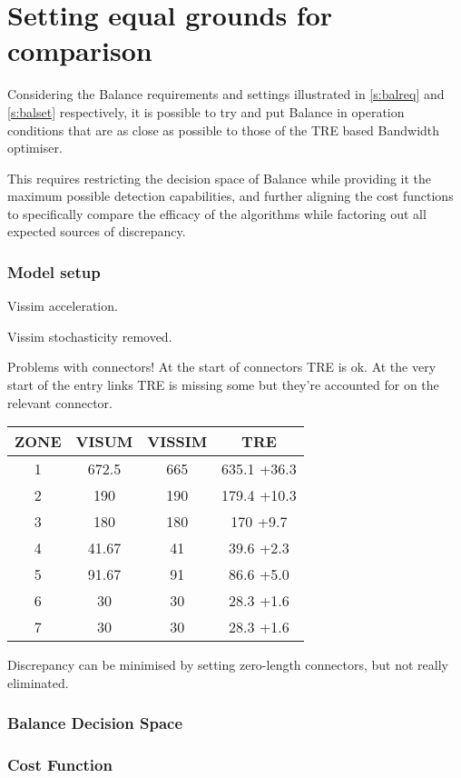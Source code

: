 \section{Setting equal grounds for comparison}

Considering the Balance requirements and settings illustrated in \ref{s:balreq} and \ref{s:balset} respectively, it is possible to try and put Balance in operation conditions that are as close as possible to those of the TRE based Bandwidth optimiser.

This requires restricting the decision space of Balance while providing it the maximum possible detection capabilities, and further aligning the cost functions to specifically compare the efficacy of the algorithms while factoring out all expected sources of discrepancy.

\subsubsection{Model setup}

Vissim acceleration.

Vissim stochasticity removed.

Problems with connectors!
At the start of connectors TRE is ok.
At the very start of the entry links TRE is missing some but they're accounted for on the relevant connector.

\begin{tabular}{|c|c|c|c|}
\hline 
ZONE & VISUM & VISSIM & TRE \\ 
\hline 
1 & 672.5 & 665 & 635.1 +36.3\\ 
2 & 190 & 190 & 179.4 +10.3\\ 
3 & 180 & 180 & 170 +9.7\\ 
4 & 41.67 & 41 & 39.6 +2.3\\ 
5 & 91.67 & 91 & 86.6 +5.0\\ 
6 & 30 & 30 & 28.3 +1.6\\ 
7 & 30 & 30 & 28.3 +1.6\\ 
\hline 
\end{tabular} 

Discrepancy can be minimised by setting zero-length connectors, but not really eliminated.

\subsubsection{Balance Decision Space}


\subsubsection{Cost Function}

